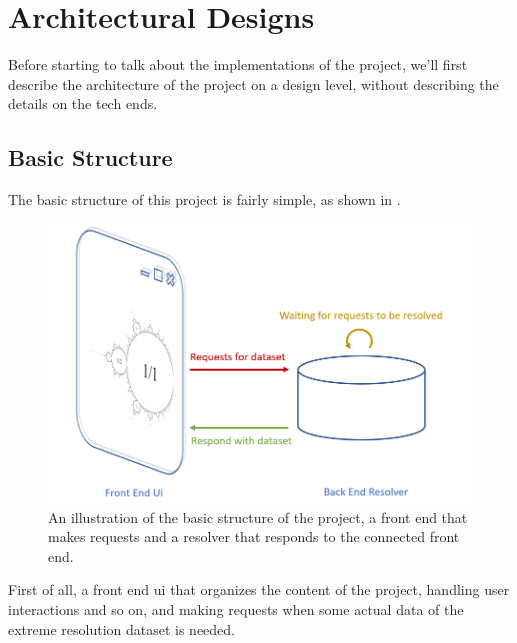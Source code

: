 
\chapter{Architectural Designs} %

\label{Chapter3} %

Before starting to talk about the implementations of the project, we'll first describe the architecture of the project on a design level, without describing the details on the tech ends.


\section{Basic Structure}

The basic structure of this project is fairly simple, as shown in .

\begin{figure}[th]
\centering
\includegraphics[width=.9\textwidth,keepaspectratio]{Figures/Chapter3/frontandback.png}
\decoRule
\caption[Basic Structure]{ An illustration of the basic structure of the project, a front end that makes requests and a resolver that responds to the connected front end. }
\label{fig:frontandback}
\end{figure}

First of all, a front end \gls{ui} that organizes the content of the project, handling user interactions and so on, and making requests when some actual data of the extreme resolution dataset is needed.

